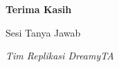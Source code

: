 \documentclass[aspectratio=169, 10pt]{beamer}
\begin{document}
\begin{frame}
    \centering
    \Huge \textbf{Terima Kasih}
    
    \vspace{1em}
    \Large Sesi Tanya Jawab
    
    \vspace{2em}
    \normalsize
    \textit{Tim Replikasi DreamyTA}
\end{frame}
\end{document}
